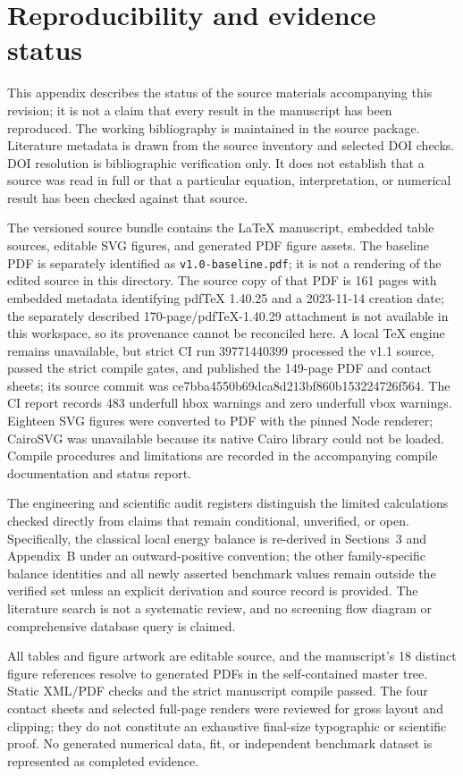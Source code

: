 \section{Reproducibility and evidence status}
\label{app:reproducibility}

This appendix describes the status of the source materials accompanying this revision; it is not a claim that every result in the manuscript has been reproduced. The working bibliography is maintained in the source package. Literature metadata is drawn from the source inventory and selected DOI checks. DOI resolution is bibliographic verification only. It does not establish that a source was read in full or that a particular equation, interpretation, or numerical result has been checked against that source.

The versioned source bundle contains the LaTeX manuscript, embedded table sources, editable SVG figures, and generated PDF figure assets. The baseline PDF is separately identified as \texttt{v1.0-baseline.pdf}; it is not a rendering of the edited source in this directory. The source copy of that PDF is 161 pages with embedded metadata identifying pdfTeX 1.40.25 and a 2023-11-14 creation date; the separately described 170-page/pdfTeX-1.40.29 attachment is not available in this workspace, so its provenance cannot be reconciled here. A local TeX engine remains unavailable, but strict CI run 39771440399 processed the v1.1 source, passed the strict compile gates, and published the 149-page PDF and contact sheets; its source commit was ce7bba4550b69dca8d213bf860b153224726f564. The CI report records 483 underfull hbox warnings and zero underfull vbox warnings. Eighteen SVG figures were converted to PDF with the pinned Node renderer; CairoSVG was unavailable because its native Cairo library could not be loaded. Compile procedures and limitations are recorded in the accompanying compile documentation and status report.

The engineering and scientific audit registers distinguish the limited calculations checked directly from claims that remain conditional, unverified, or open. Specifically, the classical local energy balance is re-derived in Sections~3 and Appendix~B under an outward-positive convention; the other family-specific balance identities and all newly asserted benchmark values remain outside the verified set unless an explicit derivation and source record is provided. The literature search is not a systematic review, and no screening flow diagram or comprehensive database query is claimed.

All tables and figure artwork are editable source, and the manuscript's 18 distinct figure references resolve to generated PDFs in the self-contained master tree. Static XML/PDF checks and the strict manuscript compile passed. The four contact sheets and selected full-page renders were reviewed for gross layout and clipping; they do not constitute an exhaustive final-size typographic or scientific proof. No generated numerical data, fit, or independent benchmark dataset is represented as completed evidence.
